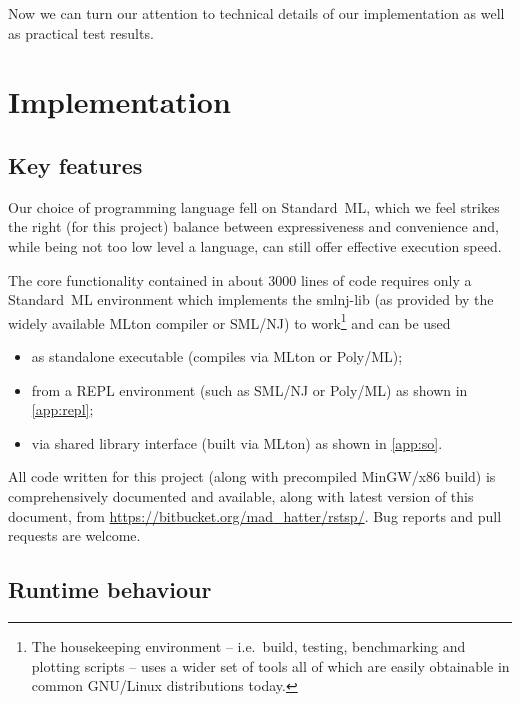 \documentclass[titlepage,twoside,index=totoc,bibliography=totoc]{scrartcl}
\numberwithin{equation}{section}
\numberwithin{figure}{section}
\numberwithin{table}{section}
\begin{document}
Now we can turn our attention to technical details of our implementation
as well as practical test results.


\section{Implementation}
\vspace{0.87em}

\subsection{Key features}

Our choice of programming language fell on Standard~ML, which we feel
strikes the right (for this project) balance between expressiveness and
convenience and, while being not too low level a language, can still offer
effective execution speed.

The core functionality contained in about 3000 lines of code
requires only a Standard~ML environment
which implements the {\ttfamily smlnj-lib}
(as provided by the widely available {\ttfamily MLton} compiler or {\ttfamily SML/NJ})
to work\footnote{%
  The housekeeping environment -- i.e.\ build, testing, benchmarking and
  plotting scripts -- uses a wider set of tools all of which are easily
  obtainable in common {\ttfamily GNU/Linux} distributions today.
}
and can be used
\begin{itemize}
  \item as standalone executable
    (compiles via {\ttfamily MLton} or {\ttfamily Poly/ML});
  \item from a REPL environment
    (such as {\ttfamily SML/NJ} or {\ttfamily Poly/ML})
    as shown in \autoref{app:repl};
  \item via shared library interface
    (built via {\ttfamily MLton}) as shown in \autoref{app:so}.
\end{itemize}

All code written for this project
(along with precompiled {\ttfamily MinGW/x86} build)
is comprehensively documented and available,
along with latest version of this document,
from \url{https://bitbucket.org/mad_hatter/rstsp/}.
Bug reports and pull requests are welcome.

\subsection{Runtime behaviour}
\end{document}
